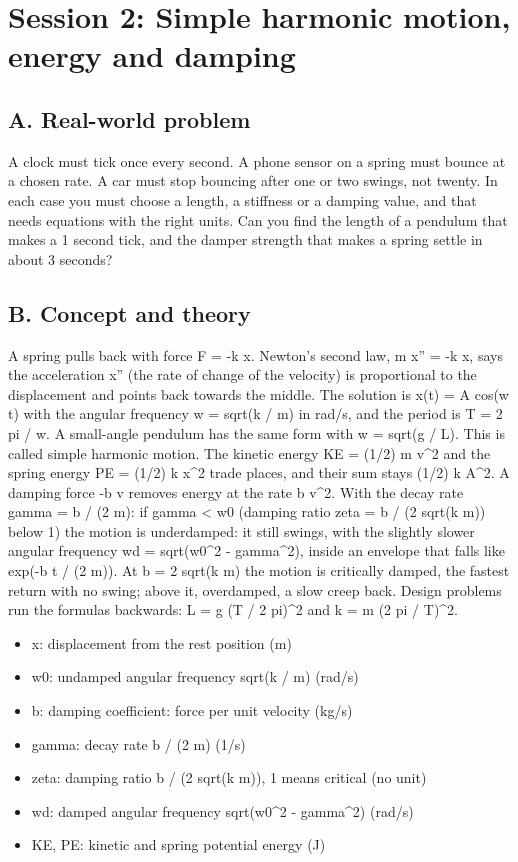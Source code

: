 \documentclass[11pt,a4paper]{article}
\begin{document}
\section{Session 2: Simple harmonic motion, energy and damping}

\subsection*{A. Real-world problem}
A clock must tick once every second. A phone sensor on a spring must bounce at a chosen rate. A car must stop bouncing after one or two swings, not twenty. In each case you must choose a length, a stiffness or a damping value, and that needs equations with the right units. Can you find the length of a pendulum that makes a 1 second tick, and the damper strength that makes a spring settle in about 3 seconds?

\subsection*{B. Concept and theory}
A spring pulls back with force F = -k x. Newton's second law, m x'' = -k x, says the acceleration x'' (the rate of change of the velocity) is proportional to the displacement and points back towards the middle. The solution is x(t) = A cos(w t) with the angular frequency w = sqrt(k / m) in rad/s, and the period is T = 2 pi / w. A small-angle pendulum has the same form with w = sqrt(g / L). This is called simple harmonic motion. The kinetic energy KE = (1/2) m v\textasciicircum{}2 and the spring energy PE = (1/2) k x\textasciicircum{}2 trade places, and their sum stays (1/2) k A\textasciicircum{}2. A damping force -b v removes energy at the rate b v\textasciicircum{}2. With the decay rate gamma = b / (2 m): if gamma \textless{} w0 (damping ratio zeta = b / (2 sqrt(k m)) below 1) the motion is underdamped: it still swings, with the slightly slower angular frequency wd = sqrt(w0\textasciicircum{}2 - gamma\textasciicircum{}2), inside an envelope that falls like exp(-b t / (2 m)). At b = 2 sqrt(k m) the motion is critically damped, the fastest return with no swing; above it, overdamped, a slow creep back. Design problems run the formulas backwards: L = g (T / 2 pi)\textasciicircum{}2 and k = m (2 pi / T)\textasciicircum{}2.

\begin{itemize}[nosep]
\item x: displacement from the rest position (m)
\item w0: undamped angular frequency sqrt(k / m) (rad/s)
\item b: damping coefficient: force per unit velocity (kg/s)
\item gamma: decay rate b / (2 m) (1/s)
\item zeta: damping ratio b / (2 sqrt(k m)), 1 means critical (no unit)
\item wd: damped angular frequency sqrt(w0\textasciicircum{}2 - gamma\textasciicircum{}2) (rad/s)
\item KE, PE: kinetic and spring potential energy (J)
\end{itemize}
\end{document}
